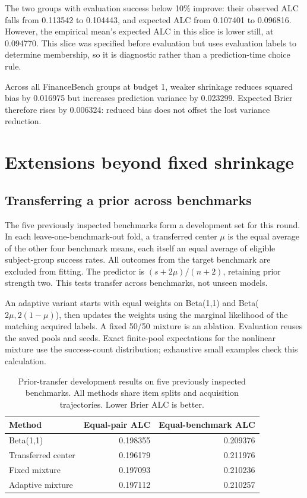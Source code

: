 \documentclass{article}
\begin{document}
The two groups with evaluation success below 10\% improve: their observed ALC falls from 0.113542 to 0.104443, and expected ALC from 0.107401 to 0.096816. However, the empirical mean's expected ALC in this slice is lower still, at 0.094770. This slice was specified before evaluation but uses evaluation labels to determine membership, so it is diagnostic rather than a prediction-time choice rule.

Across all FinanceBench groups at budget 1, weaker shrinkage reduces squared bias by 0.016975 but increases prediction variance by 0.023299. Expected Brier therefore rises by 0.006324: reduced bias does not offset the lost variance reduction.

\section{Extensions beyond fixed shrinkage}\label{extensions-beyond-fixed-shrinkage}

\subsection{Transferring a prior across benchmarks}\label{transferring-a-prior-across-benchmarks}

The five previously inspected benchmarks form a development set for this round. In each leave-one-benchmark-out fold, a transferred center \(\mu\) is the equal average of the other four benchmark means, each itself an equal average of eligible subject-group success rates. All outcomes from the target benchmark are excluded from fitting. The predictor is \((s+2\mu)/(n+2)\), retaining prior strength two. This tests transfer across benchmarks, not unseen models.

An adaptive variant starts with equal weights on Beta(1,1) and Beta(\(2\mu,2(1-\mu)\)), then updates the weights using the marginal likelihood of the matching acquired labels. A fixed 50/50 mixture is an ablation. Evaluation reuses the saved pools and seeds. Exact finite-pool expectations for the nonlinear mixture use the success-count distribution; exhaustive small examples check this calculation.

\begin{table}[ht]
\centering
\caption{Prior-transfer development results on five previously inspected benchmarks. All methods share item splits and acquisition trajectories. Lower Brier ALC is better.}
\label{tab:transfer}
\begin{tabular}{lrr}
\toprule
Method & Equal-pair ALC & Equal-benchmark ALC \\
\midrule
Beta(1,1) & 0.198355 & 0.209376 \\
Transferred center & 0.196179 & 0.211976 \\
Fixed mixture & 0.197093 & 0.210236 \\
Adaptive mixture & 0.197112 & 0.210257 \\
\bottomrule
\end{tabular}
\end{table}
\end{document}
